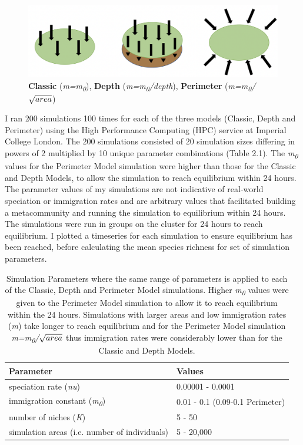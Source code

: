  \begin{figure}[h!]
\centering
  \includegraphics[scale=0.5]{models.png}
  \caption{\textbf{Classic} (\textit{m=m\textsubscript{0}}), \textbf{Depth} (\textit{m=m\textsubscript{0}/depth}), \textbf{Perimeter} (\textit{m=m\textsubscript{0}/$\protect\sqrt{area}$}) }
  \label{fig:Models}
\end{figure}

\noindent 


\noindent I ran 200 simulations 100 times for each of the three models (Classic, Depth and Perimeter) using the High Performance Computing (HPC) service at Imperial College London. The 200 simulations consisted of 20 simulation sizes differing in powers of 2 multiplied by 10 unique parameter combinations (Table 2.1). The \textit{m\textsubscript{0}} values for the Perimeter Model simulation were higher than those for the Classic and Depth Models, to allow the simulation to reach equilibrium within 24 hours. The parameter values of my simulations are not indicative of real-world speciation or immigration rates and are arbitrary values that facilitated building a metacommunity and running the simulation to equilibrium within 24 hours. The simulations were run in groups on the cluster for 24 hours to reach equilibrium. I plotted a timeseries for each simulation to ensure equilibrium has been reached, before calculating the mean species richness for set of  simulation parameters.\\

\begin{table}[h]
\centering
    \caption{Simulation Parameters where the same range of parameters is applied to each of the Classic, Depth and Perimeter Model simulations. Higher \textit{m\textsubscript{0}} values were given to the Perimeter Model simulation to allow it to reach equilibrium within the 24 hours. Simulations with larger areas and low immigration rates (\textit{m}) take longer to reach equilibrium and for the Perimeter Model simulation \textit{m=m\textsubscript{0}/$\protect\sqrt{area}$} thus immigration rates were considerably lower than for the Classic and Depth Models.}
    \label{crouch}
    \begin{tabular}{  l  p{5cm}}
        \toprule
\textbf{Parameter} 
&\textbf{Values}   \\\midrule
speciation rate (\textit{nu})
&0.00001 - 0.0001 \\\hline
immigration constant (\textit{m\textsubscript{0}})
&0.01 - 0.1 (0.09-0.1 Perimeter)\\\hline
number of niches (\textit{K})
&5 - 50 \\\hline
simulation areas (i.e. number of individuals)
& 5 - 20,000 \\
        \bottomrule
    \end{tabular}
\end{table}

